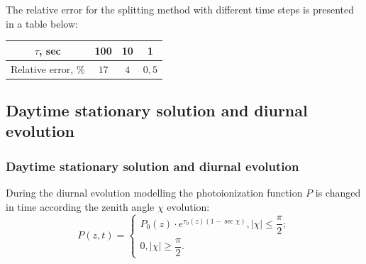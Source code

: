 \documentclass[9pt, apectratio=43,unicode]{beamer}
\begin{document}
\begin{frame}
The relative error for the splitting method with different time steps is presented in a table below:
\begin{center}
\begin{tabular}{|c|c|c|c|}
\hline
 $\tau$, sec & 100 & 10 & 1\\
\hline
Relative error, $\%$ & $17$ & $4$ & $0{,}5$\\
\hline
\end{tabular}
\end{center}
\end{frame}



\subsection{Daytime stationary solution and diurnal evolution}
\begin{frame}\frametitle{Daytime stationary solution and diurnal evolution}

During the diurnal evolution modelling the photoionization function $P$ is changed in time according the zenith angle $\chi$ evolution: $$P(z, t) = \begin{cases} P_0(z)\cdot e^{\tau_0(z)(1-\sec\chi)}, |\chi|\leq\dfrac{\pi}{2};\\ 0, |\chi|\geq\dfrac{\pi}{2}.\end{cases}$$


\end{frame}
\end{document}

